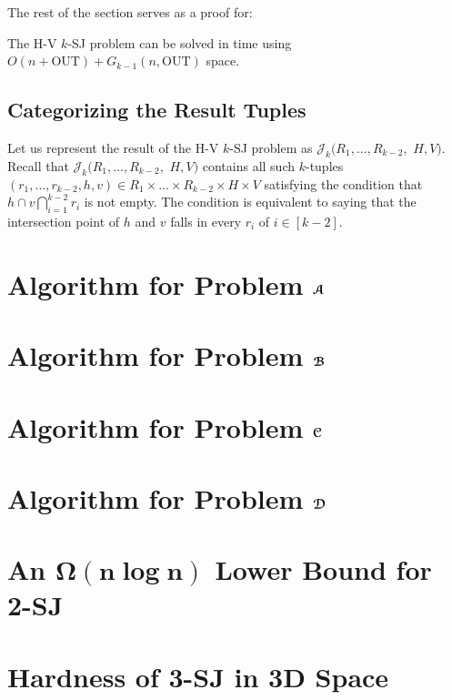 \documentclass[sigconf]{acmart}
\def\vgap{\vspace{1mm}}
\def\J{\mathcal{J}}
\def\out{\mathrm{OUT}}
\begin{document}
\vgap

The rest of the section serves as a proof for: 

\begin{lemma} \label{lmm:hv}
    The H-V $k$-SJ problem can be solved in 
    \myeqn{
        O(k) \cdot \big( F_{k-1}(n, \out) + n\log n + \out \big) \nn 
    }
    time using $O(n + \out) + G_{k-1}(n, \out)$ space.
\end{lemma}

\subsection{Categorizing the Result Tuples} \label{sec:hv:result-part}

Let us represent the result of the H-V $k$-SJ problem as $\J_k(R_1, ..., R_{k-2},$ $H, V)$. Recall that $\J_k(R_1, ..., R_{k-2},$ $H, V)$ contains all such $k$-tuples $(r_1, ..., r_{k-2}, h, v) \in R_1 \times ... \times R_{k-2} \times H \times V$ satisfying the condition that $h \cap v \bigcap_{i=1}^{k-2} r_i$ is not empty. The condition is equivalent to saying that the intersection point of $h$ and $v$ falls in every $r_i$ of $i \in [k-2]$.





\balance

\appendix 

\section{Algorithm for Problem $\textrm{\boldmath${\EuScript{A}}$}$} \label{app:prob-a}

\section{Algorithm for Problem $\textrm{\boldmath${\EuScript{B}}$}$} \label{app:prob-b}

\section{Algorithm for Problem $\textrm{\boldmath${\EuScript{C}}$}$} \label{app:prob-c}

\section{Algorithm for Problem $\textrm{\boldmath${\EuScript{D}}$}$} \label{app:prob-d}

\section{An $\bm{\Omega(n \log n)}$ Lower Bound for 2-SJ} \label{app:lb}

\section{Hardness of 3-SJ in 3D Space} \label{app:lb-cond}

\end{document}
